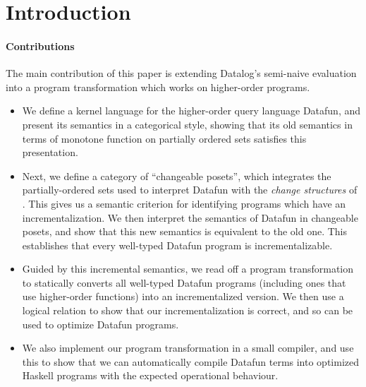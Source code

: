 \section{Introduction}
\label{sec:intro}


\paragraph{Contributions} The main contribution of this paper is
extending Datalog's semi-naive evaluation into a program transformation
which works on higher-order programs.
\begin{itemize}
\item We define a kernel language for the higher-order query language Datafun, and
  present its semantics in a categorical style, showing that its old semantics
  in terms of monotone function on partially ordered sets satisfies this presentation.
\item Next, we define a category of ``changeable posets'', which
  integrates the partially-ordered sets used to interpret Datafun with
  the \emph{change structures} of \citet{cai-et-al}. This gives us a semantic
  criterion for identifying programs which have an incrementalization. We then
  interpret the semantics of Datafun in changeable posets,
  and show that this new semantics is equivalent to the old
  one. This establishes that every well-typed Datafun program is
  incrementalizable.
\item Guided by this incremental semantics, we read off a program
  transformation to statically converts all well-typed Datafun
  programs (including ones that use higher-order functions) into an
  incrementalized version. We then use a logical relation to show that
  our incrementalization is correct, and so can be used to optimize
  Datafun programs.
\item We also implement our program transformation in a small compiler,
  and use this to show that we can automatically compile Datafun terms
  into optimized Haskell programs with the expected operational behaviour.
\end{itemize}



